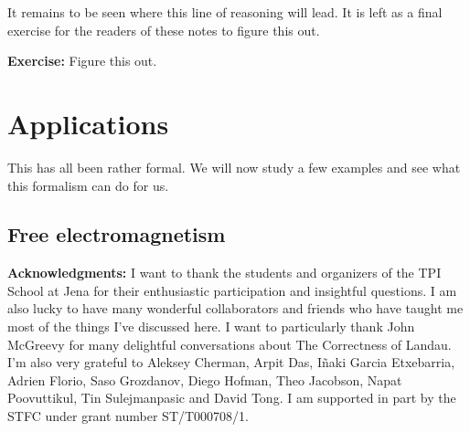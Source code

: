\documentclass[aps,preprint,nofootinbib,preprintnumbers,eqsecnum,superscriptaddress]{revtex4}
\numberwithin{equation}{section}
\begin{document}
It remains to be seen where this line of reasoning will lead. It is left as a final exercise for the readers of these notes to figure this out. 

\begin{tcolorbox}
{\bf Exercise:} 
Figure this out.
\end{tcolorbox} 


\section{Applications}

This has all been rather formal. We will now study a few examples and see what this formalism can do for us. 
\subsection{Free electromagnetism}








\newpage
{\bf Acknowledgments:} I want to thank the students and organizers of the TPI School at Jena for their enthusiastic participation and insightful questions. I am also lucky to have many wonderful collaborators and friends who have taught me most of the things I've discussed here. I want to particularly thank John McGreevy for many delightful conversations about The Correctness of Landau. I'm also very grateful to Aleksey Cherman, Arpit Das, Iñaki Garcia Etxebarria, Adrien Florio, Saso Grozdanov, Diego Hofman, Theo Jacobson, Napat Poovuttikul, Tin Sulejmanpasic and David Tong. I am supported in part by the STFC under grant number ST/T000708/1. 



\end{document}
